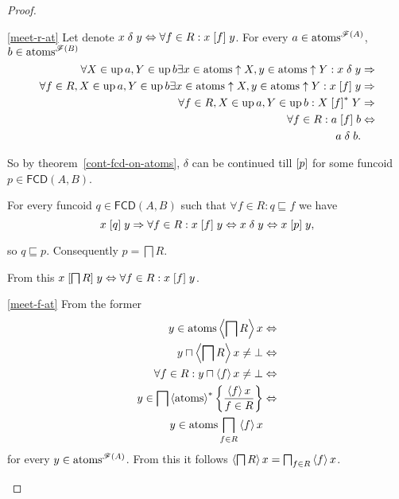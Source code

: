 \begin{proof}
\begin{widedisorder}

\item [{\ref{meet-r-at}}] Let denote $x\mathrel\delta y\Leftrightarrow\forall
f\in R:x\mathrel{\left[f\right]}y$.
For every $a\in\operatorname{atoms}^{\mathscr{F}(A)}$, $b\in\operatorname{atoms}^{\mathscr{F}(B)}$
\begin{align*}
\forall X\in\operatorname{up} a,Y\in\operatorname{up} b\exists x\in\operatorname{atoms}\uparrow X,y\in\operatorname{atoms}\uparrow
Y:x\mathrel\delta y & \Rightarrow\\
\forall f\in R,X\in\operatorname{up} a,Y\in\operatorname{up} b\exists x\in\operatorname{atoms}\uparrow X,y\in\operatorname{atoms}\uparrow
Y:x\mathrel{\left[f\right]}y & \Rightarrow\\
\forall f\in R,X\in\operatorname{up} a,Y\in\operatorname{up} b:X\mathrel{\left[f\right]^{\ast}}Y & \Rightarrow\\
\forall f\in R:a\mathrel{\left[f\right]}b & \Leftrightarrow\\
a\mathrel\delta b.
\end{align*}



So by theorem~\ref{cont-fcd-on-atoms}, $\delta$ can be continued
till $\mathrel{\left[p\right]}$ for some funcoid $p\in\mathsf{FCD}(A,B)$.


For every funcoid $q\in\mathsf{FCD}(A,B)$ such that $\forall f\in R:q\sqsubseteq
f$
we have
\[
x\mathrel{\left[q\right]}y\Rightarrow\forall f\in R:x\mathrel{\left[f\right]}y\Leftrightarrow x\mathrel\delta
y\Leftrightarrow x\mathrel{\left[p\right]}y,
\]



so $q\sqsubseteq p$. Consequently $p=\bigsqcap R$.


From this $x\mathrel{\left[\bigsqcap R\right]}y\Leftrightarrow\forall f\in R:x\mathrel{\left[f\right]}y$.

\item [{\ref{meet-f-at}}] From the former
\begin{align*}
y\in\operatorname{atoms}\left\langle \bigsqcap R\right\rangle x & \Leftrightarrow\\
y\sqcap\left\langle \bigsqcap R\right\rangle x\ne\bot & \Leftrightarrow\\
\forall f\in R:y\sqcap\left\langle f\right\rangle x\ne\bot & \Leftrightarrow\\
y\in\bigsqcap\left\langle \operatorname{atoms}\right\rangle ^{\ast}\left\{ \frac{\left\langle f\right\rangle x}{f\in R}\right\} & \Leftrightarrow\\
y\in\operatorname{atoms}\bigsqcap_{f\in R}\left\langle f\right\rangle x
\end{align*}
for every $y\in\operatorname{atoms}^{\mathscr{F}(A)}$. From this it follows $\left\langle \bigsqcap
R\right\rangle x=\bigsqcap_{f\in R}\left\langle f\right\rangle x$.
\end{widedisorder}
\end{proof}
